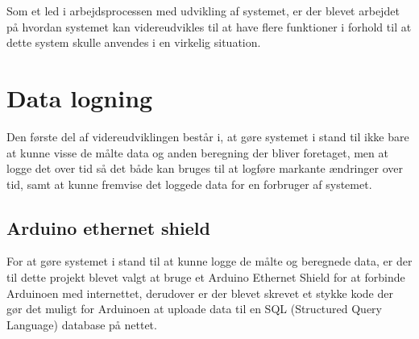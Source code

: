 Som et led i arbejdsprocessen med udvikling af systemet, er der blevet arbejdet på hvordan systemet kan videreudvikles til at have flere funktioner i forhold til at dette system skulle anvendes i en virkelig situation.

\section{Data logning}
Den første del af videreudviklingen består i, at gøre systemet i stand til ikke bare at kunne visse de målte data og anden beregning der bliver foretaget, men at logge det over tid så det både kan bruges til at logføre markante ændringer over tid, samt at kunne fremvise det loggede data for en forbruger af systemet.

\subsection{Arduino ethernet shield}
For at gøre systemet i stand til at kunne logge de målte og beregnede data, er der til dette projekt blevet valgt at bruge et Arduino Ethernet Shield for at forbinde Arduinoen med internettet, derudover er der blevet skrevet et stykke kode der gør det muligt for Arduinoen at uploade data til en SQL (Structured Query Language) database på nettet.
\newline

